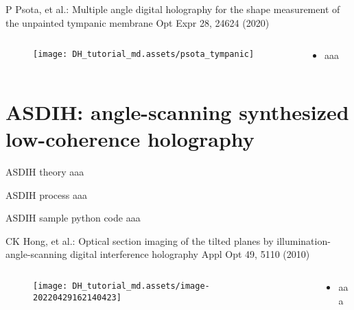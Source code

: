 \documentclass[t, aspectratio=169]{beamer}
\begin{document}
\begin{frame}{P Psota, et al.: Multiple angle digital holography for the shape measurement of the unpainted tympanic membrane}
	\vspace{-3 mm}
	\small Opt Expr  28, 24624 (2020)
	\begin{columns}
		\begin{column}{.6\textwidth}
			\begin{figure}
				\texttt{[image: DH\_tutorial\_md.assets/psota\_tympanic]}
			\end{figure}
		\end{column}
		\begin{column}{.4\textwidth}
			\begin{itemize}
				\item aaa
			\end{itemize}
		\end{column}
	\end{columns}
\end{frame}


\section{ASDIH: angle-scanning synthesized low-coherence holography}
\begin{frame}[c]
	\centering\LARGE\textbf{\secname}
\end{frame}



\begin{frame}{ASDIH theory}
aaa
\end{frame}


\begin{frame}{ASDIH process}
aaa
\end{frame}


\begin{frame}{ASDIH sample python code}
aaa
\end{frame}


\begin{frame}{CK Hong, et al.: Optical section imaging of the tilted planes by illumination-angle-scanning digital interference holography}
	\vspace{-3 mm}
	\small Appl Opt 49, 5110 (2010)
	\begin{columns}
		\begin{column}{.6\textwidth}
			\begin{figure}
				\texttt{[image: DH\_tutorial\_md.assets/image-20220429162140423]}
			\end{figure}
		\end{column}
		\begin{column}{.4\textwidth}
			\begin{itemize}
				\item aaa
			\end{itemize}
		\end{column}
	\end{columns}
\end{frame}
\end{document}
